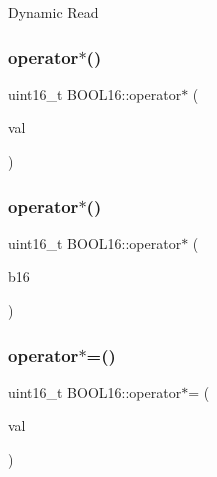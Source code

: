 Dynamic Read \hypertarget{struct_b_o_o_l16_a3511b645210e2816f439ea1983fe787e}{}\label{struct_b_o_o_l16_a3511b645210e2816f439ea1983fe787e} 
\subsubsection{\texorpdfstring{operator$\ast$()}{operator*()}\hspace{0.1cm}{\footnotesize\ttfamily [1/2]}}
{\footnotesize\ttfamily uint16\+\_\+t B\+O\+O\+L16\+::operator$\ast$ (\begin{DoxyParamCaption}\item[{const uint16\+\_\+t}]{val }\end{DoxyParamCaption})\hspace{0.3cm}{\ttfamily [inline]}}

\hypertarget{struct_b_o_o_l16_af563a43c5318213f08a27f7c7414d74a}{}\label{struct_b_o_o_l16_af563a43c5318213f08a27f7c7414d74a} 
\subsubsection{\texorpdfstring{operator$\ast$()}{operator*()}\hspace{0.1cm}{\footnotesize\ttfamily [2/2]}}
{\footnotesize\ttfamily uint16\+\_\+t B\+O\+O\+L16\+::operator$\ast$ (\begin{DoxyParamCaption}\item[{const \hyperlink{struct_b_o_o_l16}{B\+O\+O\+L16}}]{b16 }\end{DoxyParamCaption})\hspace{0.3cm}{\ttfamily [inline]}}

\hypertarget{struct_b_o_o_l16_a1d95ccb84d72f88eb9d8628aa5aeb752}{}\label{struct_b_o_o_l16_a1d95ccb84d72f88eb9d8628aa5aeb752} 
\subsubsection{\texorpdfstring{operator$\ast$=()}{operator*=()}\hspace{0.1cm}{\footnotesize\ttfamily [1/2]}}
{\footnotesize\ttfamily uint16\+\_\+t B\+O\+O\+L16\+::operator$\ast$= (\begin{DoxyParamCaption}\item[{const uint16\+\_\+t}]{val }\end{DoxyParamCaption})\hspace{0.3cm}{\ttfamily [inline]}}

